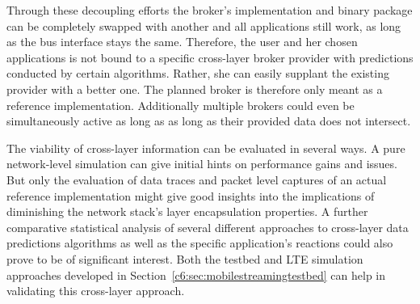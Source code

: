 Through these decoupling efforts the broker's implementation and binary package can be completely swapped with another and all applications still work, as long as the bus interface stays the same. Therefore, the user and her chosen applications is not bound to a specific cross-layer broker provider with predictions conducted by certain algorithms. Rather, she can easily supplant the existing provider with a better one. The planned broker is therefore only meant as a reference implementation. Additionally multiple brokers could even be simultaneously active as long as as long as their provided data does not intersect.

The viability of cross-layer information can be evaluated in several ways. A pure network-level simulation can give initial hints on performance gains and issues. But only the evaluation of data traces and packet level captures of an actual reference implementation might give good insights into the implications of diminishing the network stack's layer encapsulation properties. A further comparative statistical analysis of several different approaches to cross-layer data predictions algorithms as well as the specific application's reactions could also prove to be of significant interest. Both the testbed and \gls{LTE} simulation approaches developed in Section~\ref{c6:sec:mobilestreamingtestbed} can help in validating this cross-layer approach.







